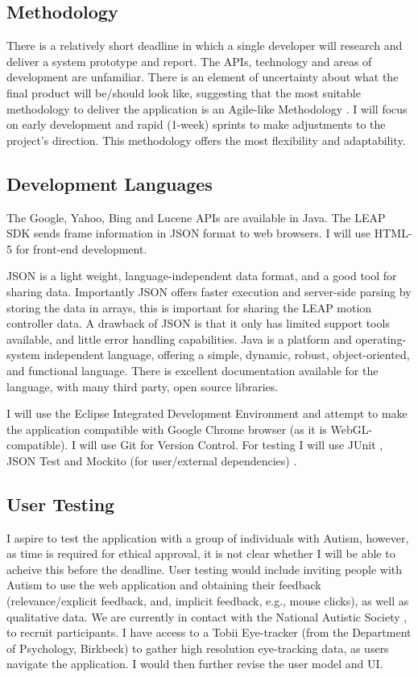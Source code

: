 \documentclass[a4paper, 11pt]{article}
\begin{document}
\begin{justify}
\subsection{Methodology}
There is a relatively short deadline in which a single developer will research and deliver a system prototype and report. The APIs, technology and areas of development are unfamiliar. There is an element of uncertainty about what the final product will be/should look like, suggesting that the most suitable methodology to deliver the application is an Agile-like Methodology \cite{agile}. I will focus on early development and rapid (1-week) sprints to make adjustments to the project's direction. This methodology offers the most flexibility and adaptability.


\subsection{Development Languages}
The Google, Yahoo, Bing and Lucene APIs are available in Java. The LEAP SDK sends frame information in JSON format to web browsers. I will use HTML-5 for front-end development.

JSON is a light weight, language-independent data format, and a good tool for sharing data. Importantly JSON offers faster execution and server-side parsing by storing the data in arrays, this is important for sharing the LEAP motion controller data. A drawback of JSON is that it only has limited support tools available, and little error handling capabilities. Java is a platform and operating-system independent language, offering a simple, dynamic, robust, object-oriented, and functional language. There is excellent documentation available for the language, with many third party, open source libraries.

I will use the Eclipse Integrated Development Environment and attempt to make the application compatible with Google Chrome browser (as it is WebGL-compatible). I will use Git for Version Control. For testing I will use JUnit \cite{junit}, JSON Test \cite{jsontest} and Mockito (for user/external dependencies) \cite{mockito}.

\subsection{User Testing}
I aspire to test the application with a group of individuals with Autism, however, as time is required for ethical approval, it is not clear whether I will be able to acheive this before the deadline. User testing would include inviting people with Autism to use the web application and obtaining their feedback (relevance/explicit feedback, and, implicit feedback, e.g., mouse clicks), as well as qualitative data. We are currently in contact with the National Autistic Society \cite{nas}, to recruit participants. I have access to a Tobii Eye-tracker (from the Department of Psychology, Birkbeck) to gather high resolution eye-tracking data, as users navigate the application. I would then further revise the user model and UI.


\end{justify}
\end{document}
